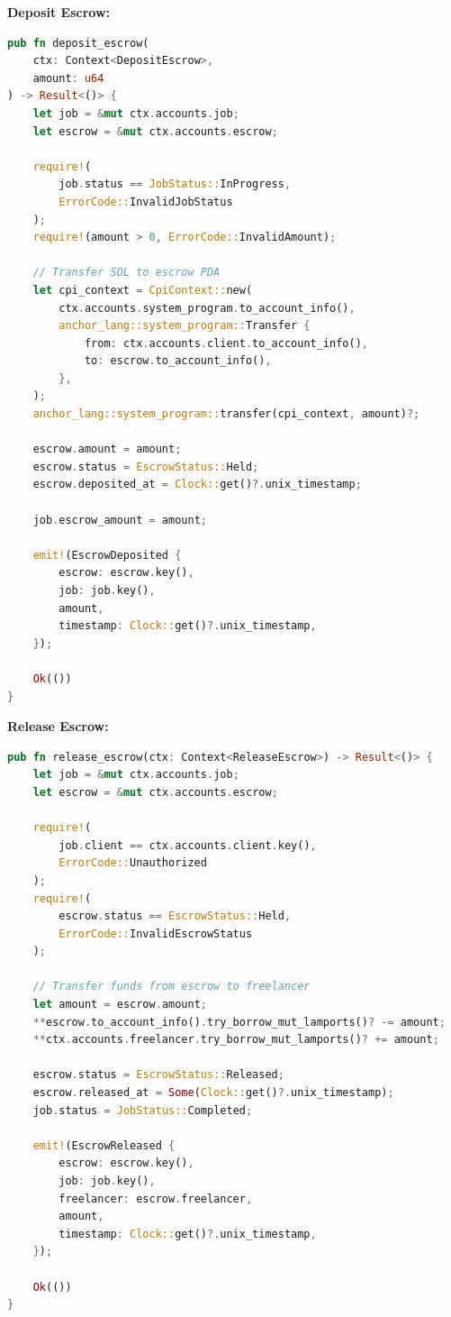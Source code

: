 \documentclass[a4paper,13pt,twoside]{report}
\theoremstyle{definition}
\begin{document}
\textbf{Deposit Escrow:}
\begin{lstlisting}[language=Rust, caption=Deposit Escrow Implementation]
pub fn deposit_escrow(
    ctx: Context<DepositEscrow>,
    amount: u64
) -> Result<()> {
    let job = &mut ctx.accounts.job;
    let escrow = &mut ctx.accounts.escrow;

    require!(
        job.status == JobStatus::InProgress,
        ErrorCode::InvalidJobStatus
    );
    require!(amount > 0, ErrorCode::InvalidAmount);

    // Transfer SOL to escrow PDA
    let cpi_context = CpiContext::new(
        ctx.accounts.system_program.to_account_info(),
        anchor_lang::system_program::Transfer {
            from: ctx.accounts.client.to_account_info(),
            to: escrow.to_account_info(),
        },
    );
    anchor_lang::system_program::transfer(cpi_context, amount)?;

    escrow.amount = amount;
    escrow.status = EscrowStatus::Held;
    escrow.deposited_at = Clock::get()?.unix_timestamp;

    job.escrow_amount = amount;

    emit!(EscrowDeposited {
        escrow: escrow.key(),
        job: job.key(),
        amount,
        timestamp: Clock::get()?.unix_timestamp,
    });

    Ok(())
}
\end{lstlisting}

\textbf{Release Escrow:}
\begin{lstlisting}[language=Rust, caption=Release Escrow Implementation]
pub fn release_escrow(ctx: Context<ReleaseEscrow>) -> Result<()> {
    let job = &mut ctx.accounts.job;
    let escrow = &mut ctx.accounts.escrow;

    require!(
        job.client == ctx.accounts.client.key(),
        ErrorCode::Unauthorized
    );
    require!(
        escrow.status == EscrowStatus::Held,
        ErrorCode::InvalidEscrowStatus
    );

    // Transfer funds from escrow to freelancer
    let amount = escrow.amount;
    **escrow.to_account_info().try_borrow_mut_lamports()? -= amount;
    **ctx.accounts.freelancer.try_borrow_mut_lamports()? += amount;

    escrow.status = EscrowStatus::Released;
    escrow.released_at = Some(Clock::get()?.unix_timestamp);
    job.status = JobStatus::Completed;

    emit!(EscrowReleased {
        escrow: escrow.key(),
        job: job.key(),
        freelancer: escrow.freelancer,
        amount,
        timestamp: Clock::get()?.unix_timestamp,
    });

    Ok(())
}
\end{lstlisting}
\end{document}
